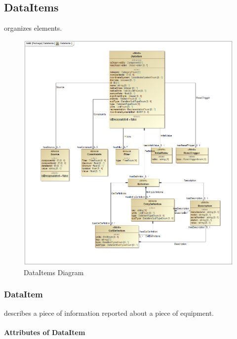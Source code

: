 \subsection{DataItems} \label{sec:DataItems}


 \glspl{organize}  elements.

\begin{figure}[ht]
  \centering
    \includegraphics[width=1.0\textwidth]{figures/DataItems.png}
  \caption{DataItems Diagram}
  \label{fig:DataItems}
\end{figure}

\FloatBarrier



\subsubsection{DataItem}
\label{sec:DataItem}



 describes a piece of information reported about a piece of equipment.


\paragraph{Attributes of DataItem}\mbox{}
\label{sec:Attributes of DataItem}

